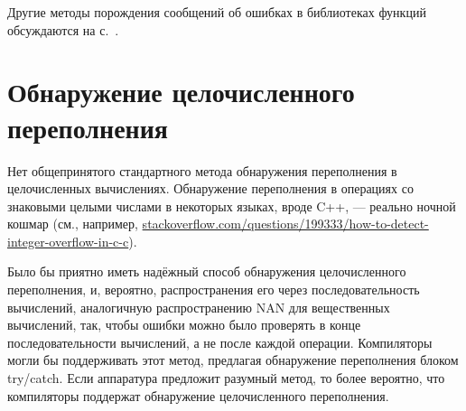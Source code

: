 \documentclass[forwardcom.tex]{subfiles}
\begin{document}
Другие методы порождения сообщений об ошибках в библиотеках функций обсуждаются на с.~\pageref{errorMessageHandling}.

\section{Обнаружение целочисленного переполнения}\label{integerOverflowDetection}
Нет общепринятого стандартного метода обнаружения переполнения в целочисленных вычислениях. Обнаружение переполнения в операциях со знаковыми целыми числами в некоторых языках, вроде C++, --- реально ночной кошмар (см., например, \href{http://stackoverflow.com/questions/199333/how-to-detect-integer-overflow-in-c-c}{stackoverflow.com/questions/199333/how-to-detect-integer-overflow-in-c-c}). 

Было бы приятно иметь надёжный способ обнаружения целочисленного переполнения, и, вероятно, распространения его через последовательность вычислений, аналогичную распространению NAN для вещественных вычислений, так, чтобы ошибки можно было проверять в конце последовательности вычислений, а не после каждой операции. Компиляторы могли бы поддерживать этот метод, предлагая обнаружение переполнения блоком try/catch. Если аппаратура предложит разумный метод, то более вероятно, что компиляторы поддержат обнаружение целочисленного переполнения.
\end{document}
